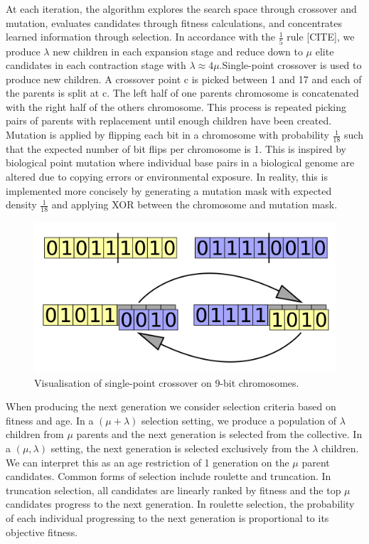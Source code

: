 At each iteration, the algorithm explores the search space through crossover and mutation, evaluates candidates through fitness calculations, and concentrates learned information through selection. In accordance with the $\frac{1}{5}$ rule [CITE], we produce $\lambda$ new children in each expansion stage and reduce down to $\mu$ elite candidates in each contraction stage with $\lambda \approx 4\mu$.Single-point crossover is used to produce new children. A crossover point c is picked between 1 and 17 and each of the parents is split at c. The left half of one parents chromosome is concatenated with the right half of the others chromosome. This process is repeated picking pairs of parents with replacement until enough children have been created.  Mutation is applied by flipping each bit in a chromosome with probability $\frac{1}{18}$ such that the expected number of bit flips per chromosome is 1. This is inspired by biological point mutation where individual base pairs in a biological genome are altered due to copying errors or environmental exposure. In reality, this is implemented more concisely by generating a mutation mask with expected density $\frac{1}{18}$ and applying XOR between the chromosome and mutation mask.\\

\begin{figure}[!h]
\centering
    \includegraphics[width=.5\textwidth]{images/single-crossover.png}
    \caption{Visualisation of single-point crossover on 9-bit chromosomes. \cite{singlecrossover}}
\label{fig:single-crossover}
\end{figure}

When producing the next generation we consider selection criteria based on fitness and age. In a $(\mu + \lambda)$ selection setting, we produce a population of $\lambda$ children from $\mu$ parents and the next generation is selected from the collective. In a $(\mu, \lambda)$ setting, the next generation is selected exclusively from the $\lambda$ children. We can interpret this as an age restriction of 1 generation on the $\mu$ parent candidates. Common forms of selection include roulette and truncation. In truncation selection, all candidates are linearly ranked by fitness and the top $\mu$ candidates progress to the next generation. In roulette selection, the probability of each individual progressing to the next generation is proportional to its objective fitness.\\

